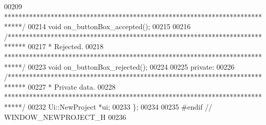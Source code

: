 \begin{DoxyCode}
00209 \textcolor{comment}{  *****************************************************************************/}
00214   \textcolor{keywordtype}{void} on\_buttonBox\_accepted();
00215 
00216   \textcolor{comment}{/*****************************************************************************}
00217 \textcolor{comment}{  * Rejected.}
00218 \textcolor{comment}{  *****************************************************************************/}
00223   \textcolor{keywordtype}{void} on\_buttonBox\_rejected();
00224 
00225 \textcolor{keyword}{private}:
00226   \textcolor{comment}{/*****************************************************************************}
00227 \textcolor{comment}{  * Private data.}
00228 \textcolor{comment}{  *****************************************************************************/}
00232   Ui::NewProject *ui;
00233 \};
00234 
00235 \textcolor{preprocessor}{#endif  // WINDOW\_NEWPROJECT\_H}
00236 
\end{DoxyCode}
